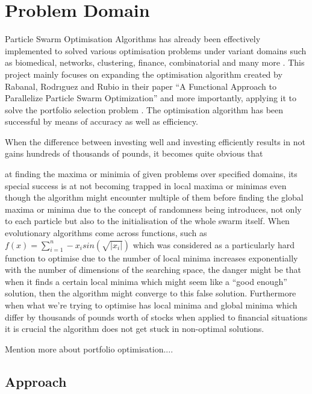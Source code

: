 \documentclass{pdfmx4020}
\begin{document}

\chapter{Problem Domain}
  
  Particle Swarm Optimisation Algorithms has already been effectively implemented to solved various optimisation problems \cite{pso_app,pso_app2,pso_app3} under variant domains such as biomedical, networks, clustering, finance, combinatorial and many more \cite{pso_app_main}. This project mainly focuses on expanding the optimisation algorithm created by Rabanal, Rodrıguez and Rubio in their paper ``A Functional Approach to Parallelize Particle Swarm Optimization'' \cite{haskellPSO} and more importantly, applying it to solve the portfolio selection problem \cite{marko2}. The optimisation algorithm has been successful by means of accuracy as well as efficiency. 

  When the difference between investing well and investing efficiently results in not gains hundreds of thousands of pounds, it becomes quite obvious that 

  at finding the maxima or minimia of given problems over specified domains, its special success is at not becoming trapped in local maxima or minimas even though the algorithm might encounter multiple of them before finding the global maxima or minima due to the concept of randomness being introduces, not only to each particle but also to the initialisation of the whole swarm itself. When evolutionary algorithms come across functions, such as $f(x)=\sum\limits_{i=1}^n -x_i sin(\sqrt{|x_i|})$ which was considered \cite{localmin} as a particularly hard function to optimise due to the number of local minima increases exponentially with the number of dimensions of the searching space, the danger might be that when it finds a certain local minima which might seem like a ``good enough'' solution, then the algorithm might converge to this false solution. Furthermore when what we're trying to optimise has local minima and global minima which differ by thousands of pounds worth of stocks when applied to financial situations it is crucial the algorithm does not get stuck in non-optimal solutions. 

  Mention more about portfolio optimisation....

  \section{Approach} %
  \label{sec:approach}
\end{document}
